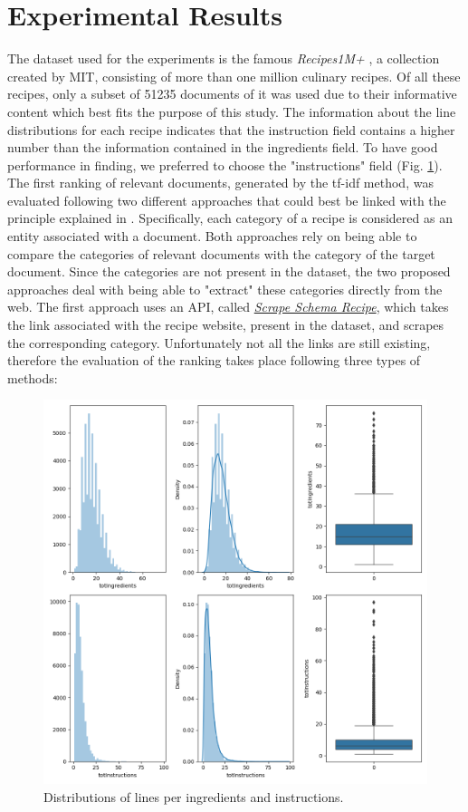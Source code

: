 \section*{Experimental Results}

The dataset used for the experiments is the famous \emph{Recipes1M+} \cite{15}, a collection 
created by MIT, consisting of more than one million culinary recipes. Of 
all these recipes, only a subset of 51235 documents of it was used due to their 
informative content which best fits the purpose of this study. The information 
about the line distributions for each recipe indicates that the instruction 
field contains a higher number than the information contained in the ingredients 
field. To have good performance in finding, we preferred to choose the 
"instructions" field (Fig. \ref{distributions}). The first ranking of relevant documents, generated 
by the tf-idf method, was evaluated following two different approaches that 
could best be linked with the principle explained in \cite{16}. Specifically, each 
category of a recipe is considered as an entity associated with a document. 
Both approaches rely on being able to compare the categories of relevant 
documents with the category of the target document. Since the categories 
are not present in the dataset, the two proposed approaches deal with being 
able to "extract" these categories directly from the web. The first approach 
uses an API, called \href{https://pypi.org/project/scrape-schema-recipe/}{\emph{Scrape Schema Recipe}}, which takes the link associated 
with the recipe website, present in the dataset, and scrapes the corresponding 
category. Unfortunately not all the links are still existing, therefore the 
evaluation of the ranking takes place following three types of methods:
\begin{figure}[h!]
    \centering
    \includegraphics[width = 0.7 \linewidth]{images/displot.png}
    \centering
    \caption{Distributions of lines per ingredients and instructions.}
    \label{distributions}
\end{figure}

